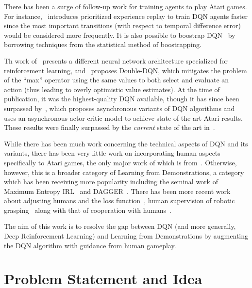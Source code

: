 \documentclass[letterpaper, 10pt, conference]{ieeeconf}
\begin{document}
There has been a surge of follow-up work for training agents to play Atari
games. For instance,~\cite{Schaul2016} introduces prioritized experience replay
to train DQN agents faster since the most important transitions (with respect to
temporal difference error) would be considered more frequently. It is also
possible to boostrap DQN~\cite{NIPS2016_6501} by borrowing techniques from the
statistical method of boostrapping.

Th work of~\cite{DBLP:conf/icml/WangSHHLF16} presents a different neural network
architecture specialized for reinforcement learning,
and~\cite{DBLP:conf/aaai/HasseltGS16} proposes Double-DQN, which mitigates
the problem of the ``max'' operator using the same values to both select and
evaluate an action (thus leading to overly optimistic value estimates). At the
time of publication, it was the highest-quality DQN available, though it has
since been surpassed by~\cite{DBLP:conf/icml/MnihBMGLHSK16}, which proposes
asynchronous variants of DQN algorithms and uses an asynchronous actor-critic
model to achieve state of the art Atari results. These results were finally
surpassed by the \emph{current} state of the art
in~\cite{DBLP:journals/corr/JaderbergMCSLSK16}.

While there has been much work concerning the technical aspects of DQN and its
variants, there has been very little work on incorporating human aspects
specifically to Atari games, the only major work of which is
from~\cite{DBLP:journals/corr/HosuR16}. Otherwise, however, this is a broader
category of Learning from Demonstrations, a category which has been receiving
more popularity including the seminal work of Maximum Entropy
IRL~\cite{Ziebart_2008_6055} and DAGGER~\cite{DBLP:journals/jmlr/RossGB11}.
There has been more recent work about adjusting humans and the loss
function~\cite{conf/nips/KimFPP13}, human supervision of robotic
grasping~\cite{DBLP:journals/corr/LaskeyCLMKJDG16,DBLP:dblp_conf/icra/LaskeySHMPDG16}
along with that of cooperation with humans~\cite{NIPS2016_6420}.

The aim of this work is to resolve the gap between DQN (and more generally, Deep
Reinforcement Learning) and Learning from Demonstrations by augmenting the DQN
algorithm with guidance from human gameplay.



\section{Problem Statement and Idea}\label{sec:idea}
\end{document}
